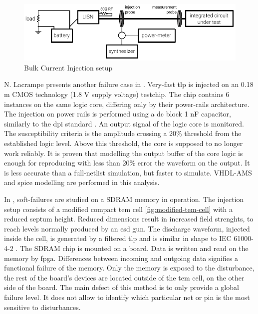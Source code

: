 \begin{figure}[!h]
  \centering
  \includegraphics[width=\textwidth]{src/1/figures/bci_setup.pdf}
  \caption{Bulk Current Injection setup}
  \label{fig:bci-setup}
\end{figure}

N. Lacrampe presents another failure case in \cite{LacrampeTransientImmunity}.
Very-fast \gls{tlp} is injected on an 0.18 \textmu{}m CMOS technology (1.8 V supply voltage) testchip.
The chip contains 6 instances on the same logic core, differing only by their power-rails architecture.
The injection on power rails is performed using a \gls{dc} block 1 nF capacitor, similarly to the \gls{dpi} standard \cite{iec62132-4}.
An output signal of the logic core is monitored.
The susceptibility criteria is the amplitude crossing a 20\% threshold from the established logic level.
Above this threshold, the core is supposed to no longer work reliably.
It is proven that modelling the output buffer of the core logic is enough for reproducing with less than 20\% error the waveform on the output.
It is less accurate than a full-netlist simulation, but faster to simulate.
VHDL-AMS and \gls{spice} modelling are performed in this analysis.

In \cite{SDRAMCase}, soft-failures are studied on a SDRAM memory in operation.
The injection setup consists of a modified compact \gls{tem} cell \ref{fig:modified-tem-cell} with a reduced septum height.
Reduced dimensions result in increased field strenghts, to reach levels normally produced by an \gls{esd} gun.
The discharge waveform, injected inside the cell, is generated by a filtered \gls{tlp} and is similar in shape to IEC 61000-4-2 \cite{iec61000-4-2}.
The SDRAM chip is mounted on a board.
Data is written and read on the memory by \gls{fpga}.
Differences between incoming and outgoing data signifies a functional failure of the memory.
Only the memory is exposed to the disturbance, the rest of the board's devices are located outside of the \gls{tem} cell, on the other side of the board.
The main defect of this method is to only provide a global failure level.
It does not allow to identify which particular net or pin is the most sensitive to disturbances.

